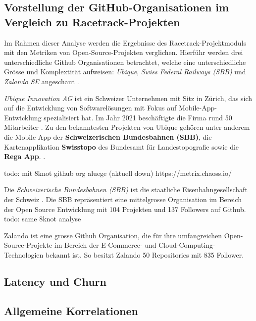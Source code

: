 \subsection{Vorstellung der GitHub-Organisationen im Vergleich zu Racetrack-Projekten}
Im Rahmen dieser Analyse werden die Ergebnisse des Racetrack-Projektmoduls mit den Metriken von Open-Source-Projekten verglichen. Hierführ werden drei unterschiedliche Github Organisationen betrachtet, welche eine unterschiedliche Grösse und Komplextität aufweisen: \textit{Ubique}, \textit{Swiss Federal Railways (SBB)} und \textit{
Zalando SE} angeschaut \parencite{noauthor_ubique_nodate} \parencite{noauthor_swiss_nodate} \parencite{noauthor_zalando_nodate}. 


\textit{Ubique Innovation AG} ist ein Schweizer Unternehmen mit Sitz in Zürich, das sich auf die Entwicklung von Softwarelösungen mit Fokus auf Mobile-App-Entwicklung spezialisiert hat. Im Jahr 2021 beschäftigte die Firma rund 50 Mitarbeiter \cite{noauthor_mathias_2021}. Zu den bekanntesten Projekten von Ubique gehören unter anderem die Mobile App der \textbf{Schweizerischen Bundesbahnen (SBB)}, die Kartenapplikation \textbf{Swisstopo} des Bundesamt für Landestopografie sowie die \textbf{Rega App}. \parencite{noauthor_apps_nodate}.

todo: mit 8knot github org aluege (aktuell down) 
https://metrix.chaoss.io/

Die \textit{Schweizerische Bundesbahnen (SBB)} ist die staatliche Eisenbahngesellschaft der Schweiz \parencite{uvek_schweizerische_nodate}. Die SBB repräsentiert eine mittelgrosse Organisation im Bereich der Open Source Entwicklung mit 104 Projekten und 137 Followers auf Github. \parencite{noauthor_swiss_nodate} 
todo: same 8knot analyse

Zalando ist eine grosse Github Organisation, die für ihre umfangreichen Open-Source-Projekte im Bereich der E-Commerce- und Cloud-Computing-Technologien bekannt ist. So besitzt Zalando 50 Repositories mit 835 Follower. \parencite{noauthor_zalando_nodate}

\subsection{Latency und Churn}
\subsection{Allgemeine Korrelationen}

